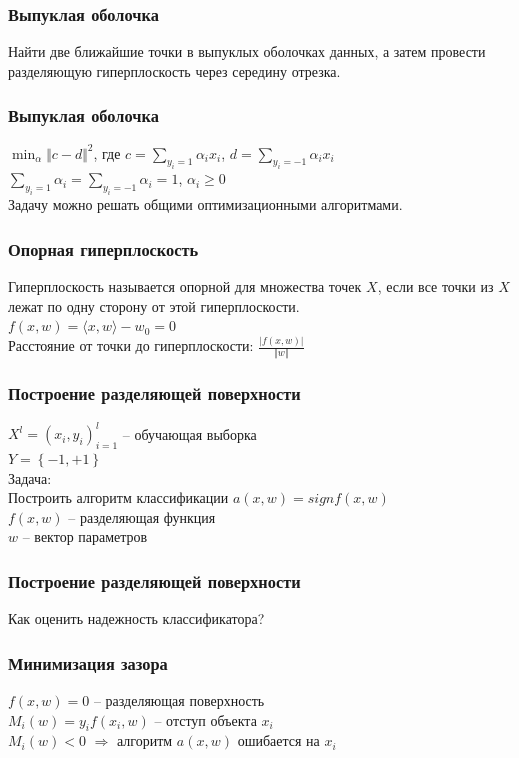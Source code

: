 \documentclass[12pt]{beamer}
\begin{document}
\begin{frame}\frametitle{Выпуклая оболочка}
Найти две ближайшие точки в выпуклых
оболочках данных, а затем провести разделяющую
гиперплоскость через середину отрезка.
\end{frame}

\begin{frame}\frametitle{Выпуклая оболочка}
$\min_\alpha \Vert c - d \Vert^2$, где $c = \sum_{y_i = 1} \alpha_ix_i$,  $d = \sum_{y_i = -1} \alpha_ix_i$\\
\vspace{5mm}
$\sum_{y_i = 1}\alpha_i = \sum_{y_i = -1}\alpha_i = 1$, $\alpha_i \geq 0$\\
\vspace{5mm}
Задачу можно решать общими оптимизационными алгоритмами.
\end{frame}


\begin{frame}\frametitle{Опорная гиперплоскость}
Гиперплоскость называется опорной для множества точек
$X$, если все точки из $X$ лежат по одну сторону от этой гиперплоскости.\\\vspace{5mm}
${f(x,w) = \langle x, w\rangle - w_0 = 0}$\\
\vspace{5mm}
Расстояние от точки до гиперплоскости:
$\frac{\vert f(x,w) \vert}{\Vert w \Vert}$
\end{frame}

\begin{frame}\frametitle{Построение разделяющей поверхности}
${X^l = (x_i,y_i)_{i = 1}^l}$ -- обучающая выборка\\ 
${Y=\left\{-1,+1\right\}}$\\
\vspace{5mm}
Задача:\\
Построить алгоритм классификации ${a(x,w) = sign f(x,w)}$\\\vspace{5mm}
${f(x,w)}$ -- разделяющая функция\\
$w$ -- вектор параметров
\end{frame}

\begin{frame}\frametitle{Построение разделяющей поверхности}
Как оценить надежность классификатора?
\end{frame}

\begin{frame}\frametitle{Минимизация зазора}
${f(x,w) = 0}$ -- разделяющая поверхность\\
${M_i(w) =y_if(x_i,w)}$ -- отступ объекта $x_i$\\
${M_i(w)<0}$ $\Rightarrow$ алгоритм $a(x,w)$ ошибается на $x_i$
\end{frame}
\end{document}
